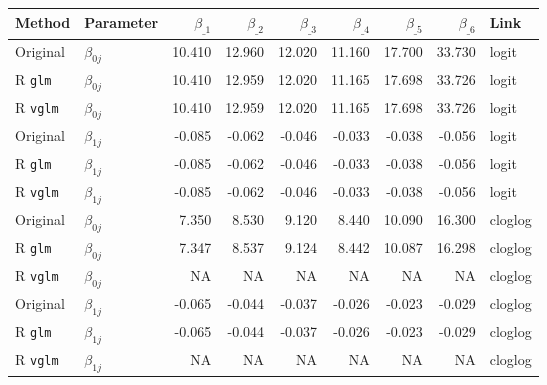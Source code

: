 
\begin{tabular}{llrrrrrrl}
\toprule
Method & Parameter & $\beta_{\_1}$ & $\beta_{\_2}$ & $\beta_{\_3}$ & $\beta_{\_4}$ & $\beta_{\_5}$ & $\beta_{\_6}$ & Link\\
\midrule
Original \citep{candy1991modeling} & $\beta_{0j}$ & 10.410 & 12.960 & 12.020 & 11.160 & 17.700 & 33.730 & logit\\
R \verb+glm+ & $\beta_{0j}$ & 10.410 & 12.959 & 12.020 & 11.165 & 17.698 & 33.726 & logit\\
R \verb+vglm+ & $\beta_{0j}$ & 10.410 & 12.959 & 12.020 & 11.165 & 17.698 & 33.726 & logit\\
\addlinespace
Original \citep{candy1991modeling} & $\beta_{1j}$ & -0.085 & -0.062 & -0.046 & -0.033 & -0.038 & -0.056 & logit\\
R \verb+glm+ & $\beta_{1j}$ & -0.085 & -0.062 & -0.046 & -0.033 & -0.038 & -0.056 & logit\\
R \verb+vglm+ & $\beta_{1j}$ & -0.085 & -0.062 & -0.046 & -0.033 & -0.038 & -0.056 & logit\\
\addlinespace
Original \citep{candy1991modeling} & $\beta_{0j}$ & 7.350 & 8.530 & 9.120 & 8.440 & 10.090 & 16.300 & cloglog\\
R \verb+glm+ & $\beta_{0j}$ & 7.347 & 8.537 & 9.124 & 8.442 & 10.087 & 16.298 & cloglog\\
R \verb+vglm+ & $\beta_{0j}$ & NA & NA & NA & NA & NA & NA & cloglog\\
\addlinespace
Original \citep{candy1991modeling} & $\beta_{1j}$ & -0.065 & -0.044 & -0.037 & -0.026 & -0.023 & -0.029 & cloglog\\
R \verb+glm+ & $\beta_{1j}$ & -0.065 & -0.044 & -0.037 & -0.026 & -0.023 & -0.029 & cloglog\\
R \verb+vglm+ & $\beta_{1j}$ & NA & NA & NA & NA & NA & NA & cloglog\\
\bottomrule
\end{tabular}